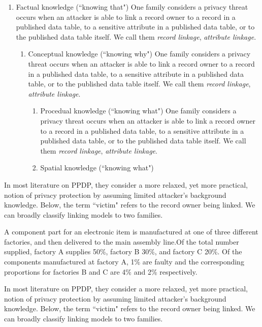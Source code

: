 \begin{enumerate}
\item Factual knowledge (``knowing that") One family considers a privacy
threat occurs when an attacker is able to link a record owner to a record
in a published data table, to a sensitive attribute in a published data
table, or to the published data table itself. We call them \emph{record
linkage}, \emph{attribute linkage}.
\begin{enumerate}
\item Conceptual knowledge (``knowing why") One family considers a privacy
threat occurs when an attacker is able to link a record owner to a record
in a published data table, to a sensitive attribute in a published data
table, or to the published data table itself. We call them \emph{record
linkage}, \emph{attribute linkage}.
\begin{enumerate}
\item Procedual knowledge (``knowing what") One family considers a privacy
threat occurs when an attacker is able to link a record owner to a record
in a published data table, to a sensitive attribute in a published data
table, or to the published data table itself. We call them \emph{record
linkage}, \emph{attribute linkage}.
\item Spatial knowledge (``knowing what")
\end{enumerate}
\end{enumerate}
\end{enumerate}

In most literature on PPDP, they \cite{jolliffe2002pca} consider a more relaxed, yet more practical, notion of privacy protection by assuming limited attacker's background knowledge. Below, the term ``victim" refers to the record owner being linked. We can broadly classify linking models to two families.

\begin{extract}
A component part for an electronic item is \cite{hyvarinen2001ica}
manufactured at one of three different factories, and then delivered to
the main assembly line.Of the total number supplied, factory A supplies
50\%, factory B 30\%, and factory C 20\%. Of the components
manufactured at factory A, 1\% are faulty and the corresponding
proportions for factories B and C are 4\% and 2\% respectively. 
\end{extract}

In most literature on PPDP, they \cite{jolliffe2002pca} consider a more relaxed, yet more practical, notion of privacy protection by assuming limited attacker's background knowledge. Below, the term ``victim" refers to the record owner being linked. We can broadly classify linking models to two families.

